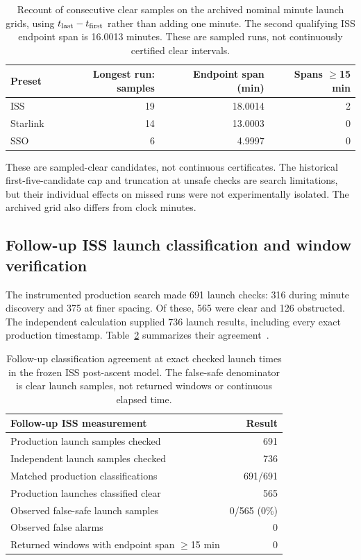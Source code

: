 \documentclass[11pt,a4paper]{article}
\begin{document}
\begin{table}[htbp]
\centering
\small
\begin{tabular}{lrrr}
\toprule
Preset & Longest run: samples & Endpoint span (min) & Spans $\geq$15 min \\
\midrule
ISS      & 19 & 18.0014 & 2 \\
Starlink & 14 & 13.0003 & 0 \\
SSO      &  6 &  4.9997 & 0 \\
\bottomrule
\end{tabular}
\caption{Recount of consecutive clear samples on the archived nominal
minute launch grids, using $t_{\rm last}-t_{\rm first}$ rather than adding
one minute. The second qualifying ISS endpoint span is 16.0013 minutes.
These are sampled runs, not continuously certified clear intervals.}
\label{tab:runs}
\end{table}

These are sampled-clear candidates, not continuous certificates. The
historical first-five-candidate cap and truncation at unsafe checks are
search limitations, but their individual effects on missed runs were not
experimentally isolated. The archived grid also differs from clock minutes.

\subsection{Follow-up ISS launch classification and window verification}
\label{sec:followup-results}

The instrumented production search made 691 launch checks: 316 during
minute discovery and 375 at finer spacing. Of these, 565 were clear and
126 obstructed. The independent calculation supplied 736 launch results,
including every exact production timestamp. Table~\ref{tab:followup}
summarizes their agreement~\cite{opas_validation}.

\begin{table}[htbp]
\centering
\begin{tabularx}{\linewidth}{Xr}
\toprule
Follow-up ISS measurement & Result \\
\midrule
Production launch samples checked & 691 \\
Independent launch samples checked & 736 \\
Matched production classifications & 691/691 \\
Production launches classified clear & 565 \\
Observed false-safe launch samples & 0/565 (0\%) \\
Observed false alarms & 0 \\
Returned windows with endpoint span $\geq$15 min & 0 \\
\bottomrule
\end{tabularx}
\caption{Follow-up classification agreement at exact checked launch times
in the frozen ISS post-ascent model. The false-safe denominator is clear
launch samples, not returned windows or continuous elapsed time.}
\label{tab:followup}
\end{table}
\end{document}
